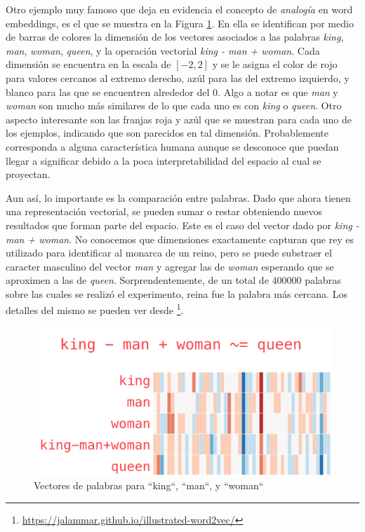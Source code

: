 Otro ejemplo muy famoso que deja en evidencia el concepto de \emph{analogía} en
word embeddings, es el que se muestra en la Figura \ref{fig:king-queen-example}.
En ella se identifican por medio de barras de colores la dimensión de los
vectores asociados a las palabras \emph{king}, \emph{man}, \emph{woman},
\emph{queen}, y la operación vectorial \emph{king - man + woman}. Cada dimensión
se encuentra en la escala de $[-2, 2]$ y se le asigna el color de rojo para
valores cercanos al extremo derecho, azúl para las del extremo izquierdo, y
blanco para las que se encuentren alrededor del 0.  Algo a notar es que
\emph{man} y \emph{woman} son mucho más similares de lo que cada uno es con
\emph{king} o \emph{queen}. Otro aspecto interesante son las franjas roja y azúl
que se muestran para cada uno de los ejemplos, indicando que son parecidos en
tal dimensión. Probablemente corresponda a alguna característica humana aunque
se desconoce que puedan llegar a significar debido a la poca interpretabilidad
del espacio al cual se proyectan.

Aun así, lo importante es la comparación entre palabras. Dado que ahora tienen
una representación vectorial, se pueden sumar o restar obteniendo nuevos
resultados que forman parte del espacio. Este es el caso del vector dado por
\emph{king - man + woman}. No conocemos que dimensiones exactamente capturan que
rey es utilizado para identificar al monarca de un reino, pero se puede
substraer el caracter masculino del vector \emph{man} y agregar las de
\emph{woman} esperando que se aproximen a las de \emph{queen}.
Sorprendentemente, de un total de 400000 palabras sobre las cuales se realizó el
experimento, reina fue la palabra más cercana. Los detalles del mismo se pueden
ver desde \footnote{\url{https://jalammar.github.io/illustrated-word2vec/}}.

\begin{figure}
    \centering
    \includegraphics[scale=0.68]{figures/king-analogy-viz.png}
    \caption{Vectores de palabras para ``king``, ``man``, y ``woman``}
    \label{fig:king-queen-example}
\end{figure}

